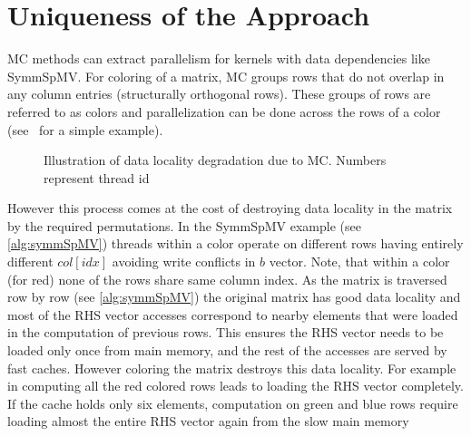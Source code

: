 \section{Uniqueness of the Approach} \label{sec:uniqueness}
\acrshort{MC} methods can extract parallelism for kernels with data dependencies like \acrshort{SymmSpMV}. For \DTWO coloring of a matrix, \acrshort{MC}
groups rows that do not overlap in any column 
entries \cite{dist_k_def} (structurally orthogonal rows). These groups of rows are referred to as colors and parallelization can be done across the rows of a color (see~ for a simple example). 
\begin{figure}[tb]
	\centering
	\hspace{0.5em}
	\caption{\label{fig:mc_problem} Illustration of data locality degradation due to \acrshort{MC}.
		Numbers represent thread id}
\end{figure}
However this process comes at the cost of destroying data locality in the matrix by the required permutations. 
In the \acrshort{SymmSpMV} example (see \cref{alg:symmSpMV}) 
threads within a color operate on different rows having entirely different 
$col[idx]$ avoiding write conflicts in $b$ vector. 
Note, that within a color (for \eg red) none of the rows share same column index.
As the matrix is traversed row by row (see \cref{alg:symmSpMV}) the original matrix
has good data locality and most of the RHS vector accesses correspond to nearby elements 
that were loaded in the computation of previous rows.
This ensures the RHS vector needs to be loaded only
once from main memory, and the rest of the accesses are served by 
fast caches. However coloring the matrix destroys this data locality. For example
in  computing all the red colored rows leads to loading the 
RHS vector completely. If the cache holds only  six elements, 
computation on green and blue rows require loading almost the entire RHS vector again 
from the slow main memory
